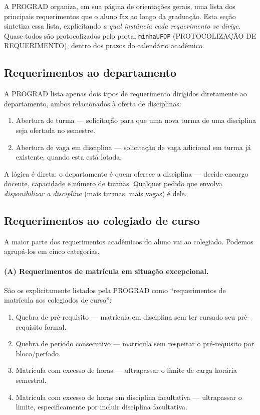\documentclass[10pt,a4paper]{extarticle}
\newcommand{\impt}[1]{\textcolor{important}{#1}}
\newcommand{\ntc}[1]{\textcolor{notice}{#1}}
\begin{document}
A PROGRAD organiza, em sua página de orientações gerais, uma lista dos principais requerimentos que o aluno faz ao longo da graduação. Esta seção sintetiza essa lista, explicitando \emph{a qual instância cada requerimento se dirige}. Quase todos são protocolizados pelo portal \texttt{minhaUFOP} (\impt{PROTOCOLIZAÇÃO DE REQUERIMENTO}), dentro dos prazos do calendário acadêmico.

\subsection{Requerimentos ao departamento}

A PROGRAD lista apenas \impt{dois tipos} de requerimento dirigidos diretamente ao departamento, ambos relacionados à oferta de disciplinas:

\begin{enumerate}[label=(\arabic*)]
    \item \impt{Abertura de turma} --- solicitação para que uma nova turma de uma disciplina seja ofertada no semestre.
    \item \impt{Abertura de vaga em disciplina} --- solicitação de vaga adicional em turma já existente, quando esta está lotada.
\end{enumerate}

\ntc{A lógica é direta: o departamento é quem oferece a disciplina --- decide encargo docente, capacidade e número de turmas. Qualquer pedido que envolva \emph{disponibilizar a disciplina} (mais turmas, mais vagas) é dele.}

\subsection{Requerimentos ao colegiado de curso}

A maior parte dos requerimentos acadêmicos do aluno vai ao colegiado. Podemos agrupá-los em cinco categorias.

\paragraph{(A) Requerimentos de matrícula em situação excepcional.} São os explicitamente listados pela PROGRAD como ``requerimentos de matrícula aos colegiados de curso'':

\begin{enumerate}[label=(\arabic*)]
    \item \impt{Quebra de pré-requisito} --- matrícula em disciplina sem ter cursado seu pré-requisito formal.
    \item \impt{Quebra de período consecutivo} --- matrícula sem respeitar o pré-requisito por bloco/período.
    \item \impt{Matrícula com excesso de horas} --- ultrapassar o limite de carga horária semestral.
    \item \impt{Matrícula com excesso de horas em disciplina facultativa} --- ultrapassar o limite, especificamente por incluir disciplina facultativa.
\end{enumerate}
\end{document}
